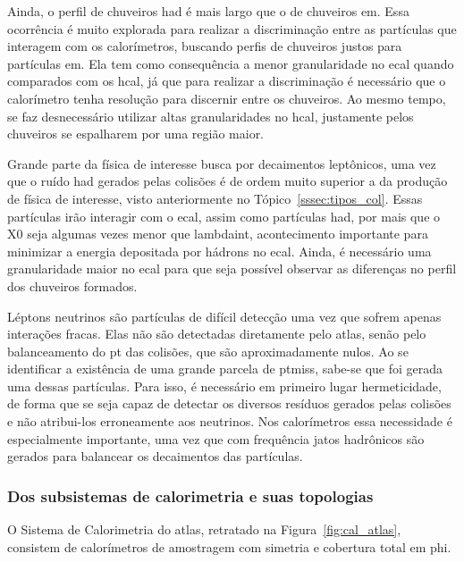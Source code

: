 Ainda, o perfil de chuveiros \gls{had} é mais largo que o de chuveiros
\gls{em}. Essa ocorrência é muito explorada para realizar a discriminação 
entre as partículas que interagem com os calorímetros, buscando perfis de chuveiros
justos para partículas \gls{em}. Ela tem como consequência 
a menor granularidade no \gls{ecal} quando comparados com os \gls{hcal}, já que
para realizar a discriminação é necessário que o calorímetro tenha resolução
para discernir entre os chuveiros. Ao mesmo tempo, se faz desnecessário
utilizar altas granularidades no \gls{hcal}, justamente pelos chuveiros se
espalharem por uma região maior.

Grande parte da física de interesse busca por decaimentos
leptônicos, uma vez que o ruído \gls{had} gerados pelas colisões é de ordem
muito superior a da produção de física de interesse, visto anteriormente no
Tópico~\ref{sssec:tipos_col}. Essas partículas irão interagir com o \gls{ecal},
assim como partículas \gls{had}, por mais que o \gls{X0} seja algumas vezes 
menor que \gls{lambdaint}, acontecimento importante para minimizar a energia depositada
por hádrons no \gls{ecal}. Ainda, é necessário uma granularidade 
maior no \gls{ecal} para que seja possível observar as diferenças no 
perfil dos chuveiros formados.

Léptons neutrinos são partículas de difícil detecção uma vez que sofrem 
apenas interações fracas. Elas não são detectadas diretamente pelo 
\gls{atlas}, senão pelo balanceamento do \gls{pt} das colisões, que são 
aproximadamente nulos. Ao se identificar a existência de uma grande parcela de 
\gls{ptmiss}, sabe-se que foi gerada uma dessas partículas. Para isso, é necessário em
primeiro lugar hermeticidade, de forma que se seja capaz de
detectar os diversos resíduos gerados pelas colisões e não atribui-los erroneamente aos neutrinos. 
Nos calorímetros essa necessidade é especialmente importante, uma vez que com frequência 
jatos hadrônicos são gerados para balancear os decaimentos das partículas.

\subsubsection{Dos subsistemas de calorimetria e suas topologias}
\label{sssec:cal_estrutura}

O Sistema de Calorimetria \cite{cal_tdr,ecal_tdr,hcal_tdr} do \gls{atlas}, retratado na
Figura~\ref{fig:cal_atlas}, consistem de calorímetros de amostragem com 
simetria e cobertura total em \gls{phi}.

